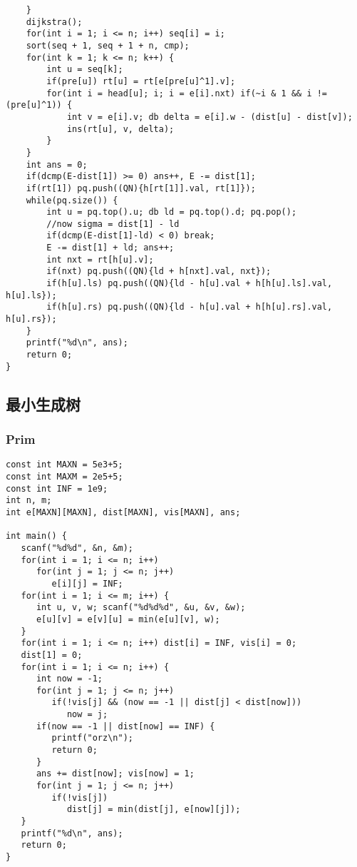 \documentclass{article}
\begin{document}
\begin{lstlisting}
	}
	dijkstra();
	for(int i = 1; i <= n; i++) seq[i] = i;
	sort(seq + 1, seq + 1 + n, cmp);
	for(int k = 1; k <= n; k++) {
		int u = seq[k];
		if(pre[u]) rt[u] = rt[e[pre[u]^1].v];
		for(int i = head[u]; i; i = e[i].nxt) if(~i & 1 && i != (pre[u]^1)) {
			int v = e[i].v; db delta = e[i].w - (dist[u] - dist[v]);
			ins(rt[u], v, delta);
		}
	}
	int ans = 0;
	if(dcmp(E-dist[1]) >= 0) ans++, E -= dist[1];
	if(rt[1]) pq.push((QN){h[rt[1]].val, rt[1]});
	while(pq.size()) {
		int u = pq.top().u; db ld = pq.top().d; pq.pop();
		//now sigma = dist[1] - ld
		if(dcmp(E-dist[1]-ld) < 0) break;
		E -= dist[1] + ld; ans++;
		int nxt = rt[h[u].v];
		if(nxt) pq.push((QN){ld + h[nxt].val, nxt});
		if(h[u].ls) pq.push((QN){ld - h[u].val + h[h[u].ls].val, h[u].ls});
		if(h[u].rs) pq.push((QN){ld - h[u].val + h[h[u].rs].val, h[u].rs});
	}
	printf("%d\n", ans);
	return 0;
}
   \end{lstlisting}
    \subsection{最小生成树}

    \subsubsection{Prim}

\begin{lstlisting}
const int MAXN = 5e3+5;
const int MAXM = 2e5+5;
const int INF = 1e9;
int n, m;
int e[MAXN][MAXN], dist[MAXN], vis[MAXN], ans;

int main() {
   scanf("%d%d", &n, &m);
   for(int i = 1; i <= n; i++)
      for(int j = 1; j <= n; j++)
         e[i][j] = INF;
   for(int i = 1; i <= m; i++) {
      int u, v, w; scanf("%d%d%d", &u, &v, &w);
      e[u][v] = e[v][u] = min(e[u][v], w);
   }
   for(int i = 1; i <= n; i++) dist[i] = INF, vis[i] = 0;
   dist[1] = 0;
   for(int i = 1; i <= n; i++) {
      int now = -1;
      for(int j = 1; j <= n; j++) 
         if(!vis[j] && (now == -1 || dist[j] < dist[now])) 
            now = j;
      if(now == -1 || dist[now] == INF) {
         printf("orz\n");
         return 0;
      }
      ans += dist[now]; vis[now] = 1;
      for(int j = 1; j <= n; j++) 
         if(!vis[j])
            dist[j] = min(dist[j], e[now][j]);
   }
   printf("%d\n", ans);
   return 0;
}
\end{lstlisting}
\end{document}
